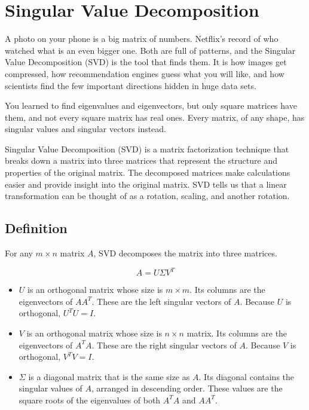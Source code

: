\chapter{Singular Value Decomposition}

A photo on your phone is a big matrix of numbers. Netflix's record of who
watched what is an even bigger one. Both are full of patterns, and the
Singular Value Decomposition (SVD) is the tool that finds them. It is how
images get compressed, how recommendation engines guess what you will like,
and how scientists find the few important directions hidden in huge data
sets.

You learned to find eigenvalues and eigenvectors, but only square matrices
have them, and not every square matrix has real ones. Every matrix, of any
shape, has singular values and singular vectors instead. 

Singular Value Decomposition (SVD) is a matrix factorization technique that breaks down a matrix into three matrices that represent the structure and properties of the original matrix. The decomposed matrices make calculations easier and provide insight into the original matrix. SVD tells us that a linear transformation can be thought of as a rotation, scaling, and another rotation.
 

\section{Definition}
For any $m \times n$ matrix $A$, SVD decomposes the matrix into three matrices.

\begin{equation}
A = U \Sigma V^T
\end{equation}

\begin{itemize}
\item $U$ is an orthogonal matrix whose size is $m \times m$. Its columns are the eigenvectors of $AA^T$. These are the left singular vectors of $A$. Because $U$ is orthogonal, $U^TU = I$.
\item $V$ is an orthogonal matrix whose size is $n \times n$ matrix. Its columns are the eigenvectors of $A^TA$. These are the right singular vectors of $A$. Because $V$ is orthogonal, $V^TV = I$.
\item  $\Sigma$ is a diagonal matrix that is the same size as $A$. Its diagonal contains the singular values of $A$, arranged in descending order. These values are the square roots of the eigenvalues of both $A^TA$ and $AA^T$. 
\end{itemize}

